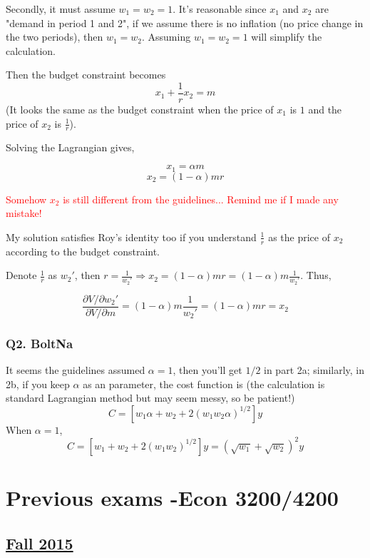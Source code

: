 \documentclass{article}
\begin{document}
Secondly, it must assume $w_1=w_2=1$. It's reasonable since $x_1$ and $x_2$ are "demand in period 1 and 2", if we assume there is no inflation (no price change in the two periods), then $w_1=w_2$. Assuming $w_1=w_2=1$ will simplify the calculation.

\smallskip

Then the budget constraint becomes $$x_1 + \frac{1}{r}x_2=m$$
(It looks the same as the budget constraint when the price of $x_1$ is $1$ and the price of $x_2$ is $\frac{1}{r}$).

\smallskip

Solving the Lagrangian gives,

$$x_1 = \alpha m$$
$$x_2 = (1-\alpha) m r$$

\textcolor{red}{Somehow $x_2$ is still different from the guidelines... Remind me if I made any mistake!}

\smallskip

My solution satisfies Roy's identity too if you understand $\frac{1}{r}$ as the price of $x_2$ according to the budget constraint.

\medskip

Denote $\frac{1}{r}$ as $w_2' $, then $r = \frac{1}{w_2'} \Rightarrow x_2 = (1-\alpha) m r = (1-\alpha) m \frac{1}{w_2'}$. Thus,

$$\frac{\partial V/ \partial w_2'}{\partial V/ \partial m}= (1-\alpha) m \frac{1}{w_2'} =(1-\alpha) m r = x_2$$


\subsubsection{Q2. BoltNa}

It seems the guidelines assumed $\alpha =1$, then you'll get $1/2$ in part 2a; similarly, in 2b, if you keep $\alpha$ as an parameter, the cost function is (the calculation is standard Lagrangian method but may seem messy, so be patient!)
$$C = [w_1 \alpha + w_2 + 2 (w_1 w_2 \alpha)^{1/2}] y$$
When $\alpha=1$,
$$C = [w_1 + w_2 + 2 (w_1 w_2 )^{1/2}] y = (\sqrt{w_1}+\sqrt{w_2})^2 y$$


\section{Previous exams -Econ 3200/4200}
\subsection{\href{https://www.uio.no/studier/emner/sv/oekonomi/ECON3200/previous-exams/ECON3200_4200-2015H.pdf}{Fall 2015}}
\end{document}
